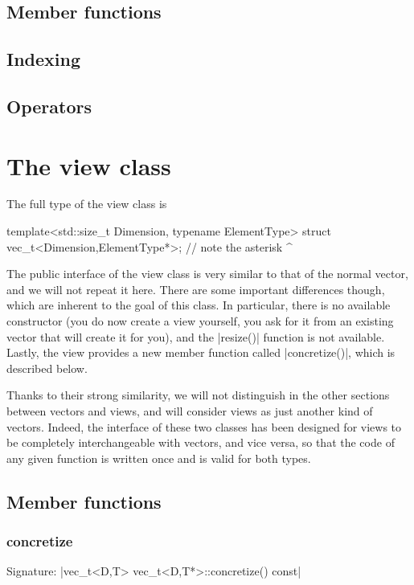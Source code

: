 \documentclass[12pt]{report}
\begin{document}
\subsection{Member functions \label{SEC:core:vec:member_fun}}
\subsection{Indexing \label{SEC:core:vec:indexing}}
\subsection{Operators \label{SEC:core:vec:operator}}

\section{The view class \label{SEC:core:view}}

The full type of the view class is
\begin{cppcode}
template<std::size_t Dimension, typename ElementType>
struct vec_t<Dimension,ElementType*>;
//              note the asterisk ^
\end{cppcode}

The public interface of the view class is very similar to that of the normal vector, and we will not repeat it here. There are some important differences though, which are inherent to the goal of this class. In particular, there is no available constructor (you do now create a view yourself, you ask for it from an existing vector that will create it for you), and the \cppinline|resize()| function is not available. Lastly, the view provides a new member function called \cppinline|concretize()|, which is described below.

Thanks to their strong similarity, we will not distinguish in the other sections between vectors and views, and will consider views as just another kind of vectors. Indeed, the interface of these two classes has been designed for views to be completely interchangeable with vectors, and vice versa, so that the code of any given function is written once and is valid for both types.

\subsection{Member functions \label{SEC:core:view:member_fun}}
\subsubsection{concretize \label{SEC:core:view:member_fun:concretize}}
Signature: \cppinline|vec_t<D,T> vec_t<D,T*>::concretize() const| \\
\end{document}
